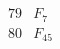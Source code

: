 \documentclass{article}
\begin{document}
{$$\begin{array}{|r|*{7}{r|}}
 & 
 & 
 & 
 & 
\\
\hline
79 
 & F_{7} &
 & 
 & 
 & 
 & 
 & 
\\
\hline
80 
 & F_{45} &
 & 
 & 
 & 
 & 
 & 

\end{array}$$}
\end{document}
